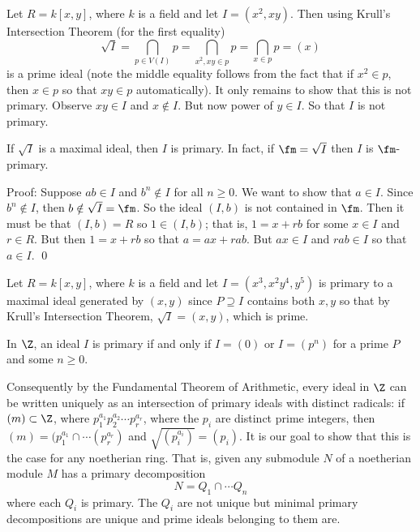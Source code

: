 \begin{ex}
Let $R=k[x,y]$, where $k$ is a field and let $I=(x^2,xy)$. Then using Krull's Intersection Theorem (for the first equality)
\[
\sqrt{I}= \bigcap_{p \in V(I)} p=\bigcap_{x^2,xy \in p} p = \bigcap_{x \in p} p=(x)
\]
is a prime ideal (note the middle equality follows from the fact that if $x^2 \in p$, then $x \in p$ so that $xy \in p$ automatically). It only remains to show that this is not primary. Observe $xy \in I$ and $x \notin I$. But now power of $y \in I$. So that $I$ is not primary. 
\end{ex}

\begin{prop}
If $\sqrt{I}$ is a maximal ideal, then $I$ is primary. In fact, if $\fm=\sqrt{I}$ then $I$ is $\fm$-primary. 
\end{prop}

\noindent Proof: Suppose $ab \in I$ and $b^n \notin I$ for all $n \geq 0$. We want to show that $a \in I$. Since $b^n \notin I$, then $b \notin \sqrt{I}=\fm$. So the ideal $(I,b)$ is not contained in $\fm$. Then it must be that $(I,b)=R$ so $1 \in (I,b)$; that is, $1=x+rb$ for some $x \in I$ and $r \in R$. But then $1=x+rb$ so that $a=ax+rab$. But $ax \in I$ and $rab \in I$ so that $a \in I$. \qed \\

\begin{ex}
Let $R=k[x,y]$, where $k$ is a field and let $I=(x^3,x^2y^4,y^5)$ is primary to a maximal ideal generated by $(x,y)$ since $P \supseteq I$ contains both $x,y$ so that by Krull's Intersection Theorem, $\sqrt{I}=(x,y)$, which is prime. 
\end{ex}

\begin{ex}
In $\Z$, an ideal $I$ is primary if and only if $I=(0)$ or $I=(p^n)$ for a prime $P$ and some $n \geq 0$.
\end{ex}

Consequently by the Fundamental Theorem of Arithmetic, every ideal in $\Z$ can be written uniquely as an intersection of primary ideals with distinct radicals: if $(m) \subset \Z$, where $p_1^{a_1}p_2^{a_2}\cdots p_r^{a_r}$, where the $p_i$ are distinct prime integers, then $(m)=(p_1^{a_1} \cap \cdots (p_r^{a_r})$ and $\sqrt{(p_i^{a_i})}=(p_i)$. It is our goal to show that this is the case for any noetherian ring. That is, given any submodule $N$ of a noetherian module $M$ has a primary decomposition
\[
N= Q_1 \cap \cdots Q_n
\]
where each $Q_i$ is primary. The $Q_i$ are not unique but minimal primary decompositions are unique and prime ideals belonging to them are. 

